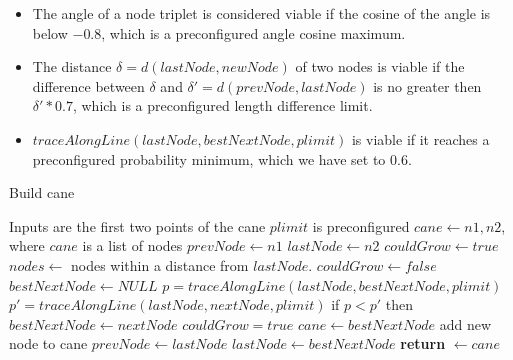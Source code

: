 \documentclass{PSAIE}%
\begin{document}
\begin{itemize}
      \item The angle of a node triplet is considered viable if the cosine of the angle is below $-0.8$,
            which is a preconfigured angle cosine maximum.
      \item The distance $\delta = d(lastNode, newNode)$ of two nodes is viable if the difference between
            $\delta$ and $\delta' = d(prevNode, lastNode)$ is no greater then $\delta' * 0.7$, which is a
            preconfigured length difference limit.
      \item $traceAlongLine(lastNode, bestNextNode, plimit)$ is viable if it reaches a preconfigured
            probability minimum, which we have set to 0.6.
\end{itemize}

\begin{algorithm}
      \caption{Build cane}
      \label{alg_build_cane}
      \begin{algorithmic}
             \Comment Inputs are the first two points of the cane
            \State $plimit$ is preconfigured
            \State $cane \gets n1, n2$, where $cane$ is a list of nodes
            \State $prevNode \gets n1$
            \State $lastNode \gets n2$
            \State $couldGrow \gets true$
            \State $nodes \gets$ nodes within a distance from $lastNode$.
            \State $couldGrow \gets false$
            \State $bestNextNode \gets NULL$
            \State $p = traceAlongLine(lastNode, bestNextNode, plimit)$
            \State $p' = traceAlongLine(lastNode, nextNode, plimit)$
            \State if $p < p'$ then $bestNextNode \gets nextNode$
            \EndIf
            \EndFor
            \State $couldGrow = true$
            \State $cane \gets bestNextNode$ \Comment add new node to cane
            \State $prevNode \gets lastNode$
            \State $lastNode \gets bestNextNode$
            \EndIf
            \EndWhile
            \State \textbf{return} $\gets cane$
            \EndFunction
      \end{algorithmic}
\end{algorithm}
\end{document}
